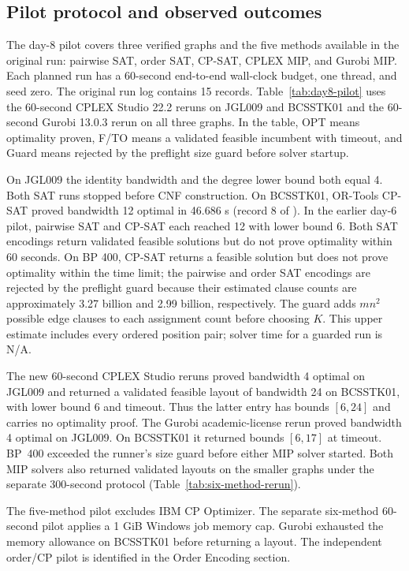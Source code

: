 \subsection{Pilot protocol and observed outcomes}
The day-8 pilot covers three verified graphs and the five methods available in the original run: pairwise SAT, order SAT, CP-SAT, CPLEX MIP, and
Gurobi MIP. Each planned run has a 60-second end-to-end wall-clock budget,
one thread, and seed zero. The original run log contains 15 records. Table~\ref{tab:day8-pilot}
uses the 60-second CPLEX Studio 22.2 reruns on JGL009 and BCSSTK01
and the 60-second Gurobi 13.0.3 rerun on all three graphs. In the table, OPT means
optimality proven, F/TO means a validated feasible incumbent with timeout, and
Guard means rejected by the preflight size guard before solver startup.

On JGL009 the identity bandwidth and the degree lower bound both equal 4. Both SAT runs stopped before CNF construction. On BCSSTK01,
OR-Tools CP-SAT proved bandwidth 12 optimal in 46.686 s (record 8 of ). In the earlier day-6 pilot, pairwise SAT and CP-SAT each reached 12 with lower bound 6. Both SAT encodings return
validated feasible solutions but do not prove optimality within 60 seconds.
On BP 400, CP-SAT returns a feasible solution but does not prove optimality
within the time limit; the pairwise and order SAT encodings are rejected by
the preflight guard because their estimated clause counts are approximately
3.27 billion and 2.99 billion, respectively. The guard adds $mn^2$ possible edge clauses to each assignment count before choosing $K$. This upper estimate includes every ordered position pair; solver time for a guarded run is N/A.

The new 60-second CPLEX Studio reruns proved bandwidth 4 optimal on
JGL009 and returned a validated feasible layout of bandwidth 24 on
BCSSTK01, with lower bound 6 and timeout. Thus the latter entry has
bounds $[6,24]$ and carries no optimality proof. The Gurobi academic-license rerun proved bandwidth 4 optimal
on JGL009. On BCSSTK01 it returned bounds $[6,17]$ at timeout. BP~400 exceeded
the runner's size guard before either MIP solver started. Both MIP solvers
also returned validated layouts on the smaller graphs under the separate
300-second protocol (Table~\ref{tab:six-method-rerun}).

The five-method pilot excludes IBM CP Optimizer. The separate six-method
60-second pilot applies a 1 GiB Windows job memory cap. Gurobi exhausted the memory allowance on BCSSTK01 before returning a layout. The independent
order/CP pilot is identified in the Order Encoding section.

